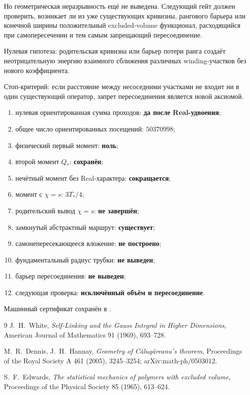 Но геометрическая неразрывность ещё не выведена. Следующий гейт должен
проверить, возникает ли из уже существующих кривизны, рангового барьера
или конечной ширины положительный excluded-volume функционал, расходящийся
при самопересечении и тем самым запрещающий пересоединение.

Нулевая гипотеза: родительская кривизна или барьер потери ранга создаёт
неотрицательную энергию взаимного сближения различных winding-участков без
нового коэффициента.

Стоп-критерий: если расстояние между несоседними участками не входит ни в
один существующий оператор, запрет пересоединения является новой аксиомой.

\begin{protocol}
\begin{enumerate}
 \item нулевая ориентированная сумма проходов: \textbf{да после Real-удвоения};
 \item общее число ориентированных посещений: \textbf{$50370998$};
 \item физический первый момент: \textbf{ноль};
 \item второй момент $Q_*$: \textbf{сохранён};
 \item нечётный момент без Real-характера: \textbf{сокращается};
 \item момент с $\chi=s$: \textbf{$3T_*/4$};
 \item родительский вывод $\chi=s$: \textbf{не завершён};
 \item замкнутый абстрактный маршрут: \textbf{существует};
 \item самонепересекающееся вложение: \textbf{не построено};
 \item фундаментальный радиус трубки: \textbf{не выведен};
 \item барьер пересоединения: \textbf{не выведен};
 \item следующая проверка: \textbf{исключённый объём и пересоединение}.
\end{enumerate}
\end{protocol}

Машинный сертификат сохранён в
.

\begin{thebibliography}{9}
J.~H.~White,
\emph{Self-Linking and the Gauss Integral in Higher Dimensions},
American Journal of Mathematics 91 (1969), 693--728.

M.~R.~Dennis, J.~H.~Hannay,
\emph{Geometry of C\u{a}lug\u{a}reanu's theorem},
Proceedings of the Royal Society A 461 (2005), 3245--3254;
arXiv:math-ph/0503012.

S.~F.~Edwards,
\emph{The statistical mechanics of polymers with excluded volume},
Proceedings of the Physical Society 85 (1965), 613--624.
\end{thebibliography}